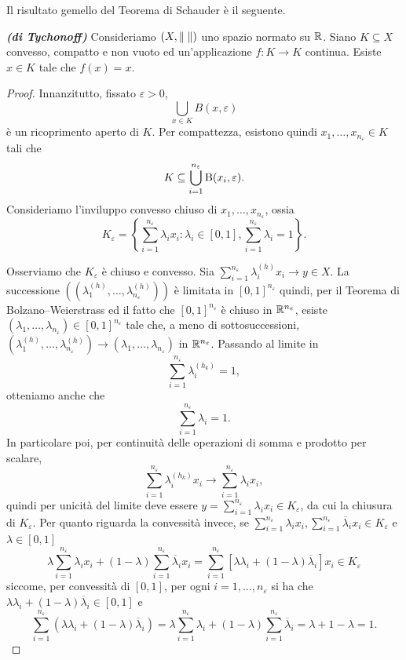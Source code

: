 Il risultato gemello del Teorema di Schauder è il seguente.
\begin{teorema}\emph{\textbf{(di Tychonoff)}}
	Consideriamo $(X,\lVert\;\rVert)$ uno spazio normato su $\mathbb{R}$. Siano $K \subseteq X$ convesso, compatto e non vuoto ed un'applicazione $f : K \to K$ continua. Esiste $x \in K$ tale che $f(x) = x$.
\end{teorema}
\begin{proof}
	Innanzitutto, fissato $\varepsilon>0$,
	\[ \bigcup_{x \in K}B(x,\varepsilon) \]
	è un ricoprimento aperto di $K$. Per compattezza, esistono quindi $x_1,\dots,x_{n_\varepsilon} \in K$ tali che
	\[ K \subseteq \bigcup_{i=1}^{n_\varepsilon}\textup{B}(x_i,\varepsilon). \]
	Consideriamo l'inviluppo convesso chiuso di $x_1,\dots, x_{n_\varepsilon}$, ossia
	\[ K_\varepsilon = \left\lbrace \sum_{i=1}^{n_\varepsilon} \lambda_i x_i : \lambda_i \in [0,1], \sum_{i=1}^{n_\varepsilon} \lambda_i =1\right\rbrace. \]
	
	Osserviamo che $K_\varepsilon$ è chiuso e convesso. Sia $\sum_{i=1}^{n_\varepsilon}\lambda_i^{(h)}x_i \to y \in X$. La successione $((\lambda_1^{(h)},\dots,\lambda_{n_\varepsilon}^{(h)}))$ è limitata in $[0,1]^{n_\varepsilon}$ quindi, per il Teorema di Bolzano--Weierstrass ed il fatto che  $[0,1]^{n_\varepsilon}$ è chiuso in $\mathbb{R}^{n_\varepsilon}$, esiste $(\lambda_1,\dots,\lambda_{n_\varepsilon}) \in [0,1]^{n_\varepsilon}$ tale che, a meno di sottosuccessioni, $(\lambda_1^{(h)},\dots,\lambda_{n_\varepsilon}^{(h)}) \to (\lambda_1,\dots,\lambda_{n_\varepsilon})$ in $\mathbb{R}^{n_\varepsilon}$. Passando al limite in 
	\[ \sum_{i=1}^{n_\varepsilon}\lambda_i^{(h_k)} = 1, \]
	otteniamo anche che 
	\[ \sum_{i=1}^{n_\varepsilon}\lambda_i = 1. \]
	In particolare poi, per continuità delle operazioni di somma e prodotto per scalare, 
	\[ \sum_{i=1}^{n_\varepsilon}\lambda_i^{(h_k)}x_i \to \sum_{i=1}^{n_\varepsilon}\lambda_ix_i,  \]
	quindi per unicità del limite deve essere $y = \displaystyle\sum_{i=1}^{n_\varepsilon}\lambda_ix_i \in K_\varepsilon$, da cui la chiusura di $K_\varepsilon$. Per quanto riguarda la convessità invece, se $\displaystyle\sum_{i=1}^{n_\varepsilon}\lambda_i x_i, \displaystyle\sum_{i=1}^{n_\varepsilon}\overline{\lambda}_i x_i \in K_\varepsilon$ e $\lambda \in [0,1]$
	\[ \lambda \sum_{i=1}^{n_\varepsilon}\lambda_i x_i + (1-\lambda)\sum_{i=1}^{n_\varepsilon}\overline{\lambda}_i x_i =  \sum_{i=1}^{n_\varepsilon}[\lambda \lambda_i +(1-\lambda)\overline{\lambda}_i]x_i \in K_\varepsilon  \]
	siccome, per convessità di $[0,1]$, per ogni $i=1,\dots,n_{\varepsilon}$ si ha che $\lambda \lambda_i +(1-\lambda)\overline{\lambda}_i \in [0,1]$ e 
	\[ \sum_{i=1}^{n_\varepsilon}\left( \lambda \lambda_i +(1-\lambda)\overline{\lambda}_i\right) = \lambda  \sum_{i=1}^{n_\varepsilon} \lambda_i +(1-\lambda) \sum_{i=1}^{n_\varepsilon}\overline{\lambda}_i = \lambda + 1 -\lambda = 1. \]
	

\end{proof}
